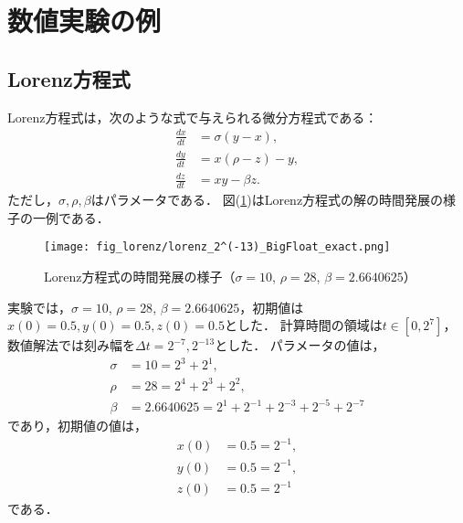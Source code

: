 \section{数値実験の例}
\subsection{Lorenz方程式}
Lorenz方程式は，次のような式で与えられる微分方程式である：
\begin{align}
    \frac{dx}{dt} &= \sigma(y-x), \\
    \frac{dy}{dt} &= x(\rho-z)-y, \\
    \frac{dz}{dt} &= xy - \beta z.
\end{align}
ただし，$\sigma,\rho,\beta$はパラメータである．
図(\ref{fig:lorenz})はLorenz方程式の解の時間発展の様子の一例である．
\begin{figure}[H]
    \centering
    \texttt{[image: fig\_lorenz/lorenz\_2^(-13)\_BigFloat\_exact.png]}
    \caption{Lorenz方程式の時間発展の様子（$\sigma=10$, $\rho=28$, $\beta=2.6640625$）}
    \label{fig:lorenz}
\end{figure}
実験では，$\sigma=10$, $\rho=28$, $\beta=2.6640625$，初期値は$x(0) = 0.5, y(0) = 0.5, z(0) = 0.5$とした．
計算時間の領域は$t \in [0,2^7]$，数値解法では刻み幅を$\Delta t =  2^{-7}, 2^{-13}$とした．
パラメータの値は，
\begin{align}
    \sigma &= 10 = 2^3 + 2^1, \\
    \rho &= 28 = 2^4 + 2^3 + 2^2, \\
    \beta &= 2.6640625 = 2^1 + 2^{-1} + 2^{-3} + 2^{-5} + 2^{-7}
\end{align}
であり，初期値の値は，
\begin{align}
    x(0) &= 0.5 = 2^{-1}, \\
    y(0) &= 0.5 = 2^{-1}, \\
    z(0) &= 0.5 = 2^{-1}
\end{align}
である．
